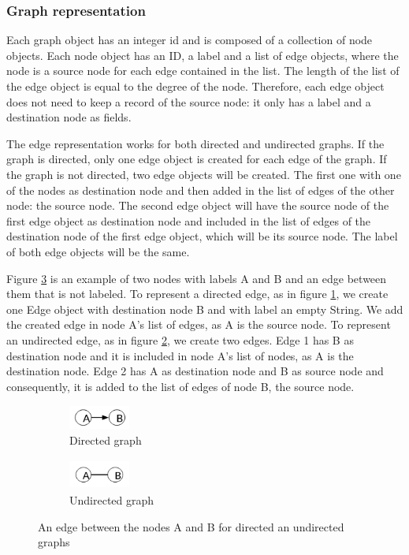 \documentclass{l4proj}
\theoremstyle{definition}
\begin{document}
\subsubsection{Graph representation}
	Each graph object has an integer id and is composed of a collection of node objects. Each node object has an ID, a label and a list of edge objects, where the node is a source node for each edge contained in the list. The length of the list of the edge object is equal to the degree of the node. Therefore, each edge object does not need to keep a record of the source node: it only has a label and a destination node as fields.
    
    The edge representation works for both directed and undirected graphs. If the graph is directed, only one edge object is created for each edge of the graph. If the graph is not directed, two edge objects will be created. The first one with one of the nodes as destination node and then added in the list of edges of the other node: the source node. The second edge object will have the source node of the first edge object as destination node and included in the list of edges of the destination node of the first edge object, which will be its source node. The label of both edge objects will be the same.
    
    Figure \ref{A-B} is an example of two nodes with labels A and B and an edge between them that is not labeled. To represent a directed edge, as in figure \ref{directed}, we create one Edge object with destination node B and with label an empty String. We add the created edge in node A's list of edges, as A is the source node. To represent an undirected edge, as in figure \ref{undirected}, we create two edges. Edge 1 has B as destination node and it is included in node A's list of nodes, as A is the destination node. Edge 2 has A as destination node and B as source node and consequently, it is added to the list of edges of node B, the source node.
     
\begin{figure}[h]
\centering
\begin{subfigure}{.5\textwidth}
  \centering
  \includegraphics[height=0.8cm,width=2cm]{A-Bdirected.png}
  \caption{Directed graph}
  \label{directed}
\end{subfigure}%
\begin{subfigure}{.5\textwidth}
  \centering
  \includegraphics[height=1cm,width=2cm]{A-B.png}
  \caption{Undirected graph}
  \label{undirected}
\end{subfigure}
\caption{An edge between the nodes A and B for directed an undirected graphs}
\label{A-B}
\end{figure}
    
\end{document}
